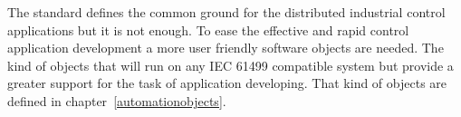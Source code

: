 The standard defines the common ground for the distributed
industrial control applications but it is not enough. To
ease the effective and rapid control application development
a more user friendly software objects are needed. The kind
of objects that will run on any IEC 61499 compatible system
but provide a greater support for the task of application
developing. That kind of objects are defined in
chapter~\ref{automationobjects}.

